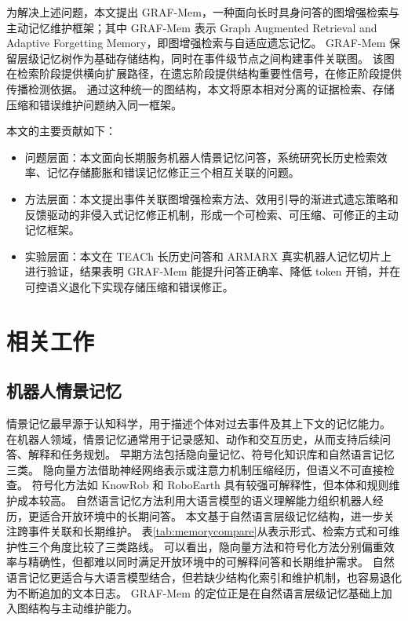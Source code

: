 \documentclass{cjc}
\begin{document}
为解决上述问题，本文提出 GRAF-Mem，一种面向长时具身问答的图增强检索与主动记忆维护框架；其中 GRAF-Mem 表示 Graph Augmented Retrieval and Adaptive Forgetting Memory，即图增强检索与自适应遗忘记忆。
GRAF-Mem 保留层级记忆树作为基础存储结构，同时在事件级节点之间构建事件关联图。
该图在检索阶段提供横向扩展路径，在遗忘阶段提供结构重要性信号，在修正阶段提供传播检测依据。
通过这种统一的图结构，本文将原本相对分离的证据检索、存储压缩和错误维护问题纳入同一框架。

本文的主要贡献如下：
\begin{itemize}
  \item 问题层面：本文面向长期服务机器人情景记忆问答，系统研究长历史检索效率、记忆存储膨胀和错误记忆修正三个相互关联的问题。
  \item 方法层面：本文提出事件关联图增强检索方法、效用引导的渐进式遗忘策略和反馈驱动的非侵入式记忆修正机制，形成一个可检索、可压缩、可修正的主动记忆框架。
  \item 实验层面：本文在 TEACh 长历史问答和 ARMARX 真实机器人记忆切片上进行验证，结果表明 GRAF-Mem 能提升问答正确率、降低 token 开销，并在可控语义退化下实现存储压缩和错误修正。
\end{itemize}

\section{相关工作}

\subsection{机器人情景记忆}

情景记忆最早源于认知科学，用于描述个体对过去事件及其上下文的记忆能力\cite{tulving1972episodic}。
在机器人领域，情景记忆通常用于记录感知、动作和交互历史，从而支持后续问答、解释和任务规划。
早期方法包括隐向量记忆、符号化知识库和自然语言记忆三类。
隐向量方法借助神经网络表示或注意力机制压缩经历\cite{bahdanau2015attention,rothfuss2018deep}，但语义不可直接检查。
符号化方法如 KnowRob 和 RoboEarth 具有较强可解释性\cite{tenorth2009knowrob,waibel2011roboearth}，但本体和规则维护成本较高。
自然语言记忆方法利用大语言模型的语义理解能力组织机器人经历\cite{rosenthal2016verbalization,zhu2017autonomous,barmann2021deep,liu2023reflect,barmann2025episodic}，更适合开放环境中的长期问答。
本文基于自然语言层级记忆结构，进一步关注跨事件关联和长期维护。
表\ref{tab:memorycompare}从表示形式、检索方式和可维护性三个角度比较了三类路线。
可以看出，隐向量方法和符号化方法分别偏重效率与精确性，但都难以同时满足开放环境中的可解释问答和长期维护需求。
自然语言记忆更适合与大语言模型结合，但若缺少结构化索引和维护机制，也容易退化为不断追加的文本日志。
GRAF-Mem 的定位正是在自然语言层级记忆基础上加入图结构与主动维护能力。
\end{document}
